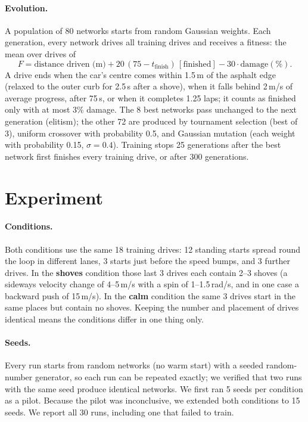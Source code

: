 \documentclass[11pt,a4paper]{article}
\begin{document}
\paragraph{Evolution.} A population of 80 networks starts from random Gaussian weights. Each generation, every network drives all training drives and receives a fitness: the mean over drives of
\begin{equation}
  F = \text{distance driven (m)} + 20\,(75 - t_{\text{finish}})\,[\text{finished}] - 30 \cdot \text{damage}(\%).
\end{equation}
A drive ends when the car's centre comes within 1.5\,m of the asphalt edge (relaxed to the outer curb for 2.5\,s after a shove), when it falls behind 2\,m/s of average progress, after 75\,s, or when it completes 1.25 laps; it counts as finished only with at most 3\% damage. The 8 best networks pass unchanged to the next generation (elitism); the other 72 are produced by tournament selection (best of 3), uniform crossover with probability 0.5, and Gaussian mutation (each weight with probability 0.15, $\sigma=0.4$). Training stops 25 generations after the best network first finishes every training drive, or after 300 generations.

\section{Experiment}
\paragraph{Conditions.} Both conditions use the same 18 training drives: 12 standing starts spread round the loop in different lanes, 3 starts just before the speed bumps, and 3 further drives. In the \textbf{shoves} condition those last 3 drives each contain 2--3 shoves (a sideways velocity change of 4--5\,m/s with a spin of 1--1.5\,rad/s, and in one case a backward push of 15\,m/s). In the \textbf{calm} condition the same 3 drives start in the same places but contain no shoves. Keeping the number and placement of drives identical means the conditions differ in one thing only.

\paragraph{Seeds.} Every run starts from random networks (no warm start) with a seeded random-number generator, so each run can be repeated exactly; we verified that two runs with the same seed produce identical networks. We first ran 5 seeds per condition as a pilot. Because the pilot was inconclusive, we extended both conditions to 15 seeds. We report all 30 runs, including one that failed to train.
\end{document}
